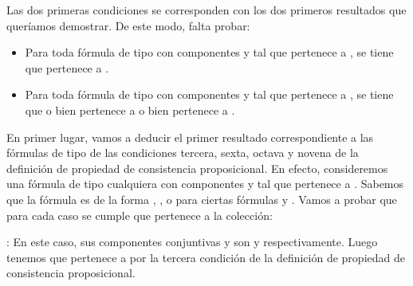 \begin{isabellebody}
\begin{isamarkuptext}
\begin{demostracion}
  Las dos primeras condiciones se corresponden con los dos primeros resultados que queríamos
  demostrar. De este modo, falta probar:
  \begin{itemize}
     \item Para toda fórmula de tipo \isa{{\isasymalpha}} con componentes  y  tal que \isa{{\isasymalpha}}
     pertenece a , se tiene que  pertenece a .
     \item Para toda fórmula de tipo \isa{{\isasymbeta}} con componentes  y  tal que \isa{{\isasymbeta}}
     pertenece a , se tiene que o bien  pertenece a  o 
     bien  pertenece a .   
  \end{itemize} 

  En primer lugar, vamos a deducir el primer resultado correspondiente a las fórmulas
  de tipo \isa{{\isasymalpha}} de las condiciones tercera, sexta, octava y novena de la definición de 
  propiedad de consistencia proposicional. En efecto, consideremos una fórmula de tipo 
  \isa{{\isasymalpha}} cualquiera con componentes  y  tal que \isa{{\isasymalpha}} pertenece a . Sabemos que 
  la fórmula es de la forma , ,  o 
   para ciertas fórmulas  y . Vamos a probar que para cada caso se cumple que 
   pertenece a la colección:

  : En este caso, sus componentes conjuntivas  y  son  
    y  respectivamente. Luego tenemos que   pertenece a  por
    la tercera condición de la definición de propiedad de consistencia
    proposicional.


\end{demostracion}
\end{isamarkuptext}
\end{isabellebody}
